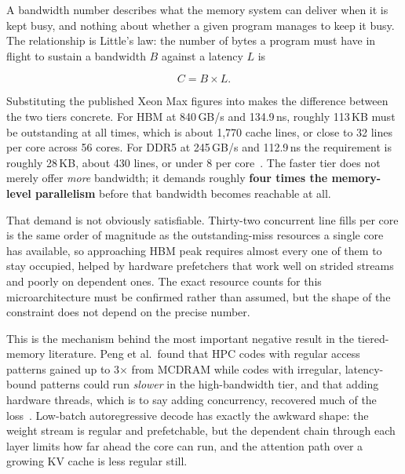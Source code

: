 A bandwidth number describes what the memory system can deliver when it
is kept busy, and nothing about whether a given program manages to keep
it busy.  The relationship is Little's law: the number of bytes a
program must have in flight to sustain a bandwidth \(B\) against a
latency \(L\) is

\begin{equation}
\label{eq:little}
  C = B \times L .
\end{equation}

Substituting the published Xeon Max figures into 
makes the difference between the two tiers concrete.  For HBM at 840\,GB/s and 134.9\,ns, roughly
113\,KB must be outstanding at all times, which is about 1{,}770 cache
lines, or close to 32 lines per core across 56 cores.  For DDR5 at 245\,GB/s
and 112.9\,ns the requirement is roughly 28\,KB, about 430 lines, or
under 8 per core~\cite{ibeid2025aurora}.  The faster tier does not merely
offer \emph{more} bandwidth; it demands roughly \textbf{four times the
memory-level parallelism} before that bandwidth becomes reachable at
all.

That demand is not obviously satisfiable.  Thirty-two concurrent line
fills per core is the same order of magnitude as the outstanding-miss
resources a single core has available, so approaching HBM peak requires
almost every one of them to stay occupied, helped by hardware
prefetchers that work well on strided streams and poorly on dependent
ones.  The exact resource counts for this microarchitecture must be
confirmed rather than assumed, but the shape of the constraint does not
depend on the precise number.

This is the mechanism behind the most important negative result in the
tiered-memory literature.  Peng et al.\ found that HPC codes with
regular access patterns gained up to 3$\times$ from MCDRAM while codes
with irregular, latency-bound patterns could run \emph{slower} in the
high-bandwidth tier, and that adding hardware threads, which is to say adding concurrency,
recovered much of the loss~\cite{peng2017hybridmemory}.  Low-batch autoregressive decode has
exactly the awkward shape: the weight stream is regular and prefetchable,
but the dependent chain through each layer limits how far ahead the core
can run, and the attention path over a growing KV cache is less regular
still.

